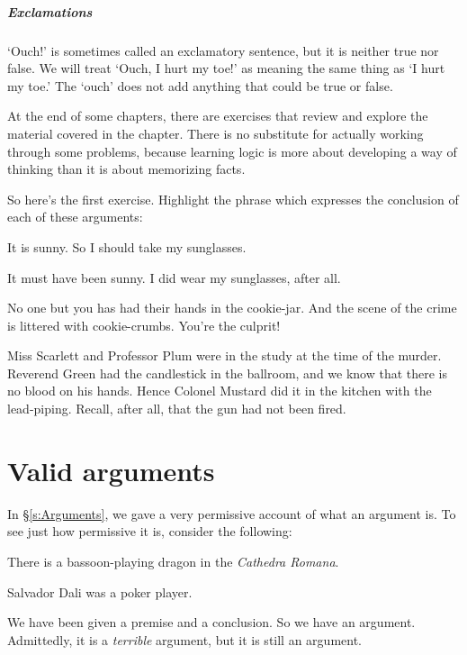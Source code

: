\paragraph{Exclamations} `Ouch!' is sometimes called an exclamatory sentence, but it is neither true nor false. We will treat `Ouch, I hurt my toe!' as meaning the same thing as `I hurt my toe.' The `ouch' does not add anything that could be true or false.


\practiceproblems
At the end of some chapters, there are exercises that review and explore the material covered in the chapter. There is no substitute for actually working through some problems, because learning logic is more about developing a way of thinking than it is about memorizing facts.

\medskip

So here's the first exercise. Highlight the phrase which expresses the conclusion of each of these arguments:
\begin{earg}
	\item It is sunny. So I should take my sunglasses.
	\item It must have been sunny. I did wear my sunglasses, after all.
	\item No one but you has had their hands in the cookie-jar. And the scene of the crime is littered with cookie-crumbs. You're the culprit!
	\item Miss Scarlett and Professor Plum were in the study at the time of the murder. Reverend Green had the candlestick in the ballroom, and we know that there is no blood on his hands. Hence Colonel Mustard did it in the kitchen with the lead-piping. Recall, after all, that the gun had not been fired.
\end{earg}


\chapter{Valid arguments}
\label{s:Valid}

In \S\ref{s:Arguments}, we gave a very permissive account of what an argument is. To see just how permissive it is, consider the following:
	\begin{earg}
		\item[] There is a bassoon-playing dragon in the \emph{Cathedra Romana}.
		\item[\therefore] Salvador Dali was a poker player.
	\end{earg}
We have been given a premise and a conclusion. So we have an argument. Admittedly, it is a \emph{terrible} argument, but it is still an argument.

